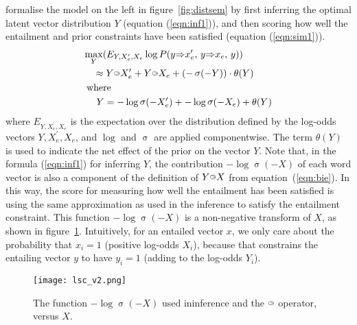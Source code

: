 \documentclass[11pt,a4paper]{article}
\DeclareMathOperator*{\sig}{\sigma}
\newcommand{\entail}{{\Rightarrow}}
\newcommand{\bie}{{\raisebox{1.8pt}{\makebox[0pt][l]{\hspace{1.3pt}${\scriptscriptstyle >}$}${\scriptscriptstyle \bigcirc}$}}}
\begin{document}
\citet{Henderson16_acl} formalise the model on the left in
figure~\ref{fig:distsem} by first inferring the optimal latent vector
distribution $Y$ (equation (\ref{eqn:inf1})), and then scoring how well the
entailment and prior constraints have been satisfied (equation
(\ref{eqn:sim1})).
\begin{align}
  \max_Y&(E_{Y,X^\prime_e,X_e} \log P(y\entail x^\prime_e,\,y\entail x_e,\,y) )
  \nonumber
  \\
  &\!\!\!\!\!\!\approx
  Y\bie X^\prime_e + Y\bie X_e + ({-}\sig({-}Y))\cdot \theta(Y)
  \label{eqn:sim1}
  \\
  \mbox{where}\hspace{-2ex}&
  \nonumber
  \\&\!\!\!\! %
  Y =  - \log\sig({-}X^\prime_e) + - \log\sig({-}X_e) + \theta(Y) 
  \label{eqn:inf1}
\end{align}
where $E_{Y,X^\prime_e,X_e}$ is the expectation over the distribution defined
by the log-odds vectors $Y,X^\prime_e,X_e$, and $\log$ and $\sig$ are applied
componentwise.  The term $\theta(Y)$ is used to indicate the net effect of the
prior on the vector $Y$.  Note that, in the formula (\ref{eqn:inf1}) for
inferring $Y$, the contribution ${-}\log\sig({-}X)$ of each word vector is
also a component of the definition of $Y\bie X $ from
equation~(\ref{eqn:bie}).
In this way, the score for measuring how well the entailment has been
satisfied is using the same approximation as used in the inference to satisfy
the entailment constraint.  This function ${-}\log\sig({-}X)$ is a non-negative
transform of $X$, as shown in figure~\ref{fig:lsc}.  Intuitively, for an
entailed vector $x$, we only care about the probability that $x_i{=}1$
(positive log-odds $X_i$), because that constrains the entailing vector $y$ to
have $y_i{=}1$ (adding to the log-odds $Y_i$).

\begin{figure}[htb]
  \centerline{\texttt{[image: lsc\_v2.png]}}
  \vspace{-0.4cm}
  \caption{ The function {\color{green4} ${-}\log\sig({-}X)$} used in\linebreak inference and the
    $\bie$ operator, versus {\color{blue} $X$}. 
  }
  \label{fig:lsc}
\end{figure}
\end{document}

